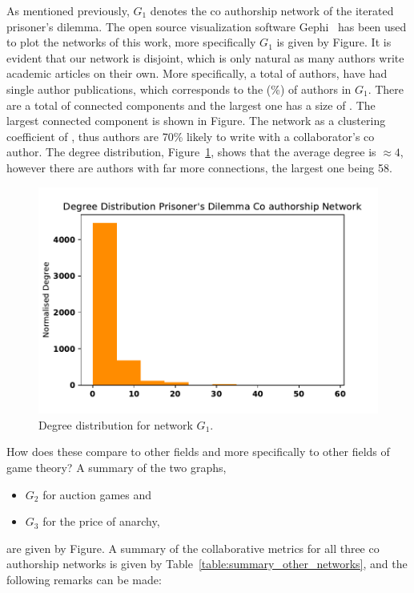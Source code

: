 \documentclass{article}
\theoremstyle{definition}
\newcommand{\isolated}{}
\newcommand{\isolatedpercentage}{}
\newcommand{\connectedcomponents}{}
\newcommand{\largestcc}{}
\newcommand{\clustering}{}
\begin{document}
As mentioned previously, \(G_1\) denotes the co authorship network of the iterated
prisoner's dilemma. The open source visualization software Gephi~\cite{ICWSM09154}
has been used
to plot the networks of this work, more specifically \(G_1\) is given by Figure. %
It is evident that our network is disjoint, which is only natural as many authors
write academic articles on their own. More specifically, a total of \isolated authors,
have had single author publications, which corresponds to the \isolatedpercentage (\%)
of authors in \(G_1\). There are a total of \connectedcomponents connected components
and the largest one has a size of \largestcc. The largest connected component is shown in
Figure. %
The network as a clustering coefficient of \clustering, thus authors are 70\% likely
to write with a collaborator's co author. 
The degree distribution, Figure~\ref{fig:degree_distr_pd}, shows that the
average degree is \(\approx4\), however there are authors with far more connections,
the largest one being 58.

\begin{figure}[!hbtp]
    \centering
    \includegraphics[width=.5\textwidth]{./assets/images/pd_degree_distribution.pdf}
    \caption{Degree distribution for network \(G_1\).}\label{fig:degree_distr_pd}
\end{figure}

How does these compare to other fields and more specifically to other fields of
game theory? A summary of the two graphs,

\begin{itemize}
    \item \(G_2\) for auction games and
    \item \(G_3\) for the price of anarchy,
\end{itemize}

are given by Figure.
A summary of the collaborative metrics for all three co authorship networks is given by
Table~\ref{table:summary_other_networks}, and the following remarks can be made:
\end{document}
